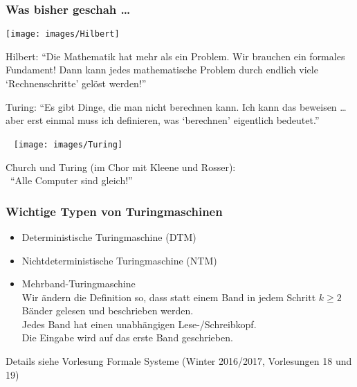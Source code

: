 \documentclass[onlymath]{beamer}
\begin{document}
\maketitle

\begin{frame}\frametitle{Was bisher geschah \ldots}\label{frame_hilbert}\label{frame_turing_child}

\begin{minipage}{2.3cm}
\texttt{[image: images/Hilbert]}
\end{minipage}
\begin{minipage}{7.5cm}
Hilbert: "`Die Mathematik hat mehr als ein Problem. Wir brauchen ein formales Fundament! Dann kann jedes mathematische Problem durch endlich viele `Rechnenschritte' gelöst werden!"'
\end{minipage}

\bigskip

\begin{minipage}{7.3cm}
Turing: "`Es gibt Dinge, die man nicht berechnen kann. Ich kann das beweisen \ldots{} aber erst einmal muss ich definieren, was `berechnen' eigentlich bedeutet."'
\end{minipage}
\begin{minipage}{2.4cm}
~\hspace{4mm}
\texttt{[image: images/Turing]}
\end{minipage}

\bigskip

Church und Turing (im Chor mit Kleene und Rosser):\\~\hfill"`Alle Computer sind gleich!"'\hfill~

\end{frame}

\begin{frame}\frametitle{Wichtige Typen von Turingmaschinen}

\begin{itemize}
\item \alert{Deterministische Turingmaschine} (DTM)
\item \alert{Nichtdeterministische Turingmaschine} (NTM)
\item \alert{Mehrband-Turingmaschine}\\
	Wir ändern die Definition so, dass statt einem Band in jedem Schritt $k\geq 2$ Bänder gelesen
	und beschrieben werden.\\
	Jedes Band hat einen unabhängigen Lese-/Schreibkopf.\\
	Die Eingabe wird auf das erste Band geschrieben.
\end{itemize}


Details siehe Vorlesung Formale Systeme (Winter 2016/2017, Vorlesungen 18 und 19)

\end{frame}
\end{document}

